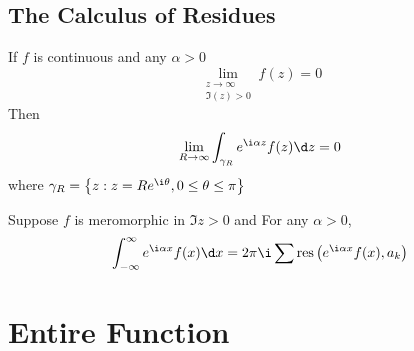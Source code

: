 \documentclass[12pt, oneside]{book}
\begin{document}
\section{The Calculus of Residues}
\begin{lemma}[Jordan]
    If $f$ is continuous and any $\alpha >0 $
    \begin{equation*}
        \lim_{\substack{z\to \infty \\ \Im(z)>0}} f(z) =0
    \end{equation*}
    Then
    \begin{equation*}
        \lim_{R \to \infty}
        \int_{\gamma_R} e^{\i \alpha z}f(z) \d z
        =
        0
    \end{equation*}
    where $\gamma_R = \left\{z: z=R e^{\i \theta}, 0 \leq \theta \leq \pi\right\}$
\end{lemma}
\begin{theorem}
    Suppose $f$ is meromorphic in $\Im z >0$ and
    For any $\alpha>0$,
    \begin{equation*}
        \int_{-\infty}^\infty e^{\i \alpha x} f(x) \d x
        =
        2 \pi \i \sum \res\left(e^{\i \alpha x} f(x), a_k\right)
    \end{equation*}
\end{theorem}








































\chapter{Entire Function}
\end{document}

